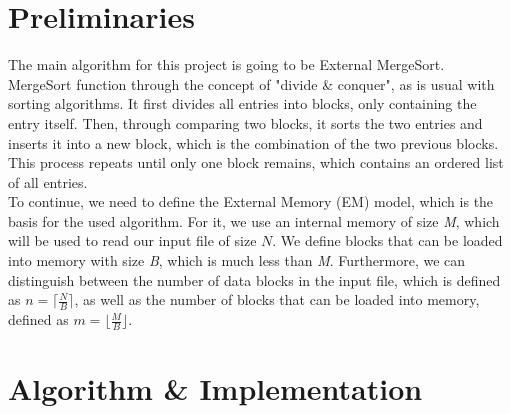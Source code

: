 \documentclass[twocolumn]{article}
\begin{document}
\section{Preliminaries}
The main algorithm for this project is going to be External MergeSort.\\
MergeSort function through the concept of "divide \& conquer", as is usual with sorting algorithms. It first divides all entries into blocks, only containing the entry itself. Then, through comparing two blocks, it sorts the two entries and inserts it into a new block, which is the combination of the two previous blocks.\\
This process repeats until only one block remains, which contains an ordered list of all entries.\\
To continue, we need to define the External Memory (EM) model, which is the basis for the used algorithm. For it, we use an internal memory of size \textit{M}, which will be used to read our input file of size $N$. We define blocks that can be loaded into memory with size \textit{B}, which is much less than \textit{M}. 
Furthermore, we can distinguish between the number of data blocks in the input file, which is defined as $n = \lceil \frac{N}{B}\rceil$, as well as the number of blocks that can be loaded into memory, defined as $m = \lfloor \frac{M}{B}\rfloor$.


\section{Algorithm \& Implementation}
\end{document}
